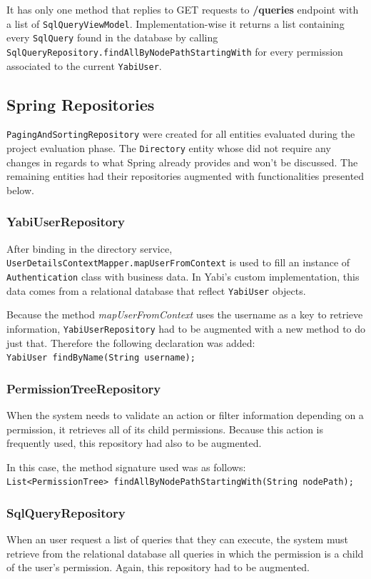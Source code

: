 It has only one method that replies to \textsc{GET} requests to \textbf{/queries} endpoint with a list of \texttt{SqlQueryViewModel}. Implementation-wise it returns a list containing every \texttt{SqlQuery} found in the database by calling \texttt{SqlQueryRepository.findAllByNodePathStartingWith} for every permission associated to the current \texttt{YabiUser}.

\subsection{Spring Repositories}\label{impl:repos}
\texttt{PagingAndSortingRepository} were created for all entities evaluated during the project evaluation phase.
The \texttt{Directory} entity whose did not require any changes in regards to what Spring already provides and won't be discussed.
The remaining entities had their repositories augmented with functionalities presented below.

\subsubsection{YabiUserRepository}
After binding in the directory service, \texttt{UserDetailsContextMapper.mapUserFromContext} is used to fill an instance of \texttt{Authentication} class with business data. In \gls{Yabi}'s custom implementation, this data comes from a relational database that reflect \texttt{YabiUser} objects.

Because the method \textit{mapUserFromContext} uses the username as a key to retrieve information, \texttt{YabiUserRepository} had to be augmented with a new method to do just that. Therefore the following declaration was added:\\
\texttt{YabiUser findByName(String username);}

\subsubsection{PermissionTreeRepository}
When the system needs to validate an action or filter information depending on a permission, it retrieves all of its child permissions. Because this action is frequently used, this repository had also to be augmented.

In this case, the method signature used was as follows:\\
\texttt{List<PermissionTree> findAllByNodePathStartingWith(String~nodePath);}

\subsubsection{SqlQueryRepository}
When an user request a list of queries that they can execute, the system must retrieve from the relational database all queries in which the permission is a child of the user's permission. Again, this repository had to be augmented.

